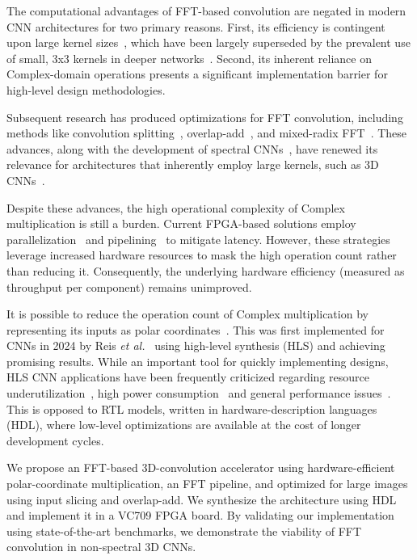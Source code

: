   The computational advantages of FFT-based convolution are negated in modern CNN architectures for two primary reasons. First, its efficiency is contingent upon large kernel sizes~\cite{lavin2016fast}, which have been largely superseded by the prevalent use of small, 3x3 kernels in deeper networks~\cite{simonyan2014very}. Second, its inherent reliance on Complex-domain operations presents a significant implementation barrier for high-level design methodologies.
  
  Subsequent research has produced optimizations for FFT convolution, including methods like convolution splitting~\cite{chitsaz2020acceleration}, overlap-add~\cite{highlander2016very,chen2024fast}, and mixed-radix FFT~\cite{meng2024high}. These advances, along with the development of spectral CNNs~\cite{pratt2017fcnn,liu2021accelerating,ayat2019spectral,han2021deep,watanabe2021image}, have renewed its relevance for architectures that inherently employ large kernels, such as 3D CNNs~\cite{nguyen2016energy, lan2017high, li20243d}.

  Despite these advances, the high operational complexity of Complex multiplication is still a burden. Current FPGA-based solutions employ parallelization~\cite{li2024split} and pipelining~\cite{fan2021high} to mitigate latency. However, these strategies leverage increased hardware resources to mask the high operation count rather than reducing it. Consequently, the underlying hardware efficiency (measured as throughput per component) remains unimproved.

  It is possible to reduce the operation count of Complex multiplication by representing its inputs as polar coordinates~\cite{lera2023hardware}. This was first implemented for CNNs in 2024 by Reis \textit{et al.}~\cite{reis2024phasor} using high-level synthesis (HLS) and achieving promising results. While an important tool for quickly implementing designs, HLS CNN applications have been frequently criticized regarding resource underutilization~\cite{xu2024flare,jiang2025fpga,antunes2025fpga}, high power consumption~\cite{salman2020comparative} and general performance issues~\cite{faber2022challenges,ahmed2023autohls,lau2024rapidstream}. This is opposed to RTL models, written in hardware-description languages (HDL), where low-level optimizations are available at the cost of longer development cycles.

  \ifCLASSOPTIONcompsoc\else %
    \IEEEpubidadjcol
  \fi
  
  We propose an FFT-based 3D-convolution accelerator using hardware-efficient polar-coordinate multiplication, an FFT pipeline, and optimized for large images using input slicing and overlap-add. We synthesize the architecture using HDL and implement it in a VC709 FPGA board. By validating our implementation using state-of-the-art benchmarks, we demonstrate the viability of FFT convolution in non-spectral 3D CNNs.
  
